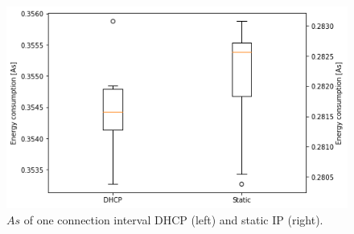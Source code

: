 \begin{figure}[H]
    \centering
    \includegraphics[width =\linewidth]{fig/dhcp_static_boxplot.png}
    \caption{$As$ of one connection interval DHCP (left) and static IP (right).}
    \label{fig:dhcp_boxplot}
\end{figure}
